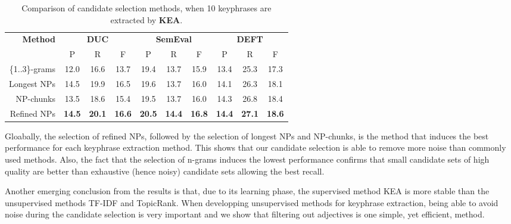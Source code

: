       \begin{table}
        \centering
        \begin{tabular}{rccccccccc}
          \toprule
          \multirow{2}{*}[-2pt]{\textbf{Method}} & \multicolumn{3}{c}{\textbf{DUC}} & \multicolumn{3}{c}{\textbf{SemEval}} & \multicolumn{3}{c}{\textbf{DEFT}}\\
          \cmidrule(r){2-4}\cmidrule(lr){5-7}\cmidrule(l){8-10}
          & P & R & F & P & R & F & P & R & F\\
          \midrule
          \{1..3\}-grams & 12.0 & 16.6 & 13.7 & 19.4 & 13.7 & 15.9 & 13.4 & 25.3 & 17.3\\
          Longest NPs & 14.5 & 19.9 & 16.5 & 19.6 & 13.7 & 16.0 & 14.1 & 26.3 & 18.1\\
          NP-chunks & 13.5 & 18.6 & 15.4 & 19.5 & 13.7 & 16.0 & 14.3 & 26.8 & 18.4\\
          Refined NPs & \textbf{14.5} & \textbf{20.1} & \textbf{16.6} & \textbf{20.5} & \textbf{14.4} & \textbf{16.8} & \textbf{14.4} & \textbf{27.1} & \textbf{18.6}\\
          \bottomrule
        \end{tabular}
        \caption{Comparison of candidate selection methods, when 10 keyphrases
                 are extracted by \textbf{KEA}.
                 \label{tab:kea_results}}
      \end{table}
      
      Gloabally, the selection of refined NPs, followed by the selection of
      longest NPs and NP-chunks, is the method that induces the best performance
      for each keyphrase extraction method. This shows that our candidate
      selection is able to remove more noise than commonly used methods. Also,
      the fact that the selection of n-grams induces the lowest performance
      confirms that small candidate sets of high quality are better than
      exhaustive (hence noisy) candidate sets allowing the best recall.
      
      Another emerging conclusion from the results is that, due to its
      learning phase, the supervised method KEA is more stable than the
      unsupervised methods TF-IDF and TopicRank. When developping unsupervised
      methods for keyphrase extraction, being able to avoid noise during the
      candidate selection is very important and we show that filtering out
      adjectives is one simple, yet efficient, method.

